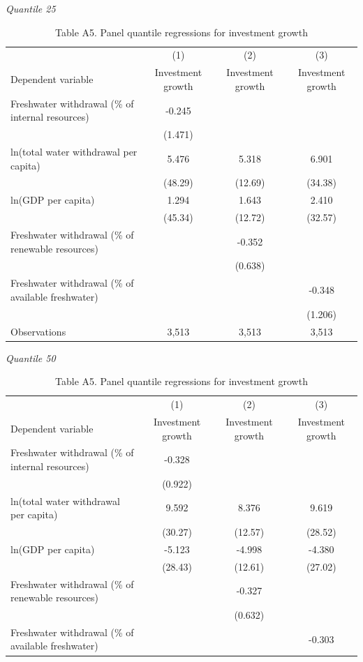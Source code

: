 \begin{table}[htbp]
\centering
\caption{Table A5. Panel quantile regressions for investment growth}
\small
\textit{Quantile 25}\\
\begin{tabular}{lccc}
\hline
 & (1) & (2) & (3) \\
Dependent variable & Investment growth & Investment growth & Investment growth \\
\hline
Freshwater withdrawal (\% of internal resources) & -0.245 &  &  \\
 & (1.471) &  &  \\
ln(total water withdrawal per capita) & 5.476 & 5.318 & 6.901 \\
 & (48.29) & (12.69) & (34.38) \\
ln(GDP per capita) & 1.294 & 1.643 & 2.410 \\
 & (45.34) & (12.72) & (32.57) \\
Freshwater withdrawal (\% of renewable resources) &  & -0.352 &  \\
 &  & (0.638) &  \\
Freshwater withdrawal (\% of available freshwater) &  &  & -0.348 \\
 &  &  & (1.206) \\
\hline
Observations & 3,513 & 3,513 & 3,513 \\
\hline
\end{tabular}
\vspace{0.75em}
\textit{Quantile 50}\\
\begin{tabular}{lccc}
\hline
 & (1) & (2) & (3) \\
Dependent variable & Investment growth & Investment growth & Investment growth \\
\hline
Freshwater withdrawal (\% of internal resources) & -0.328 &  &  \\
 & (0.922) &  &  \\
ln(total water withdrawal per capita) & 9.592 & 8.376 & 9.619 \\
 & (30.27) & (12.57) & (28.52) \\
ln(GDP per capita) & -5.123 & -4.998 & -4.380 \\
 & (28.43) & (12.61) & (27.02) \\
Freshwater withdrawal (\% of renewable resources) &  & -0.327 &  \\
 &  & (0.632) &  \\
Freshwater withdrawal (\% of available freshwater) &  &  & -0.303 \\

\end{tabular}
\end{table}
